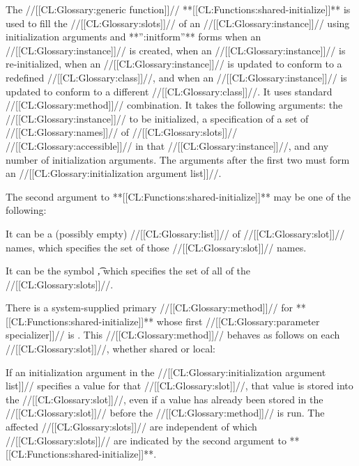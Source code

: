 The //[[CL:Glossary:generic function]]// **[[CL:Functions:shared-initialize]]** is used to fill the 
//[[CL:Glossary:slots]]//
of an //[[CL:Glossary:instance]]// 
using initialization arguments and **'':initform''**
forms when an //[[CL:Glossary:instance]]// is created, when an 
//[[CL:Glossary:instance]]// is re-initialized,
when an //[[CL:Glossary:instance]]// 
is updated to conform to a redefined //[[CL:Glossary:class]]//, and when
an //[[CL:Glossary:instance]]// is updated to conform to a different //[[CL:Glossary:class]]//.
It uses
standard //[[CL:Glossary:method]]// combination. It takes the following arguments: the
//[[CL:Glossary:instance]]// to be initialized, a 
specification of a set of //[[CL:Glossary:names]]// of //[[CL:Glossary:slots]]//
//[[CL:Glossary:accessible]]// in that //[[CL:Glossary:instance]]//, and any number of initialization
arguments.  The arguments after the first two must form an
//[[CL:Glossary:initialization argument list]]//.
                        
The second argument to **[[CL:Functions:shared-initialize]]** may be one of the following:

\beginlist

\itemitem{\bull} It can be a (possibly empty) //[[CL:Glossary:list]]// of //[[CL:Glossary:slot]]// names,
which specifies the set of those //[[CL:Glossary:slot]]// names. 








\itemitem{\bull} It can be the symbol \t, which specifies the set of all of the //[[CL:Glossary:slots]]//.

\endlist
                                               
There is a system-supplied primary //[[CL:Glossary:method]]// for **[[CL:Functions:shared-initialize]]**
whose first //[[CL:Glossary:parameter specializer]]// is .
This //[[CL:Glossary:method]]// behaves as follows on each //[[CL:Glossary:slot]]//, 
whether shared or local:

\beginlist

\itemitem{\bull} If an initialization argument in the 
//[[CL:Glossary:initialization argument list]]// specifies a value for that //[[CL:Glossary:slot]]//, 
that value is stored
into the //[[CL:Glossary:slot]]//, even if a value has already been stored in the //[[CL:Glossary:slot]]//
before the //[[CL:Glossary:method]]// is run.  
The affected //[[CL:Glossary:slots]]// are independent of which
//[[CL:Glossary:slots]]// are indicated by the second argument to **[[CL:Functions:shared-initialize]]**.


